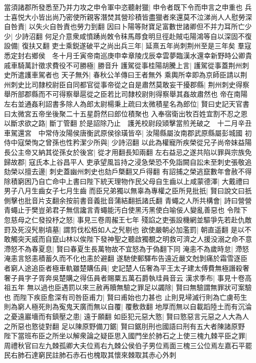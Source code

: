 當須諸郡所發悉至乃并力攻之申令軍中恣聽射獵|{
	申令者既下令而申言之申重也}
兵士喜悦大小皆出尚乃密使所親客潛焚其營珍積皆盡獵者來還莫不泣涕尚人人慰勞深自咎責|{
	以失火自咎責也勞力到翻}
因曰卜陽等財寶足富數世諸卿但不并力耳所亡少少|{
	少詩沼翻}
何足介意衆咸憤踴尚敇令秣馬蓐食明旦徑赴賊屯陽鴻等自以深固不復設備|{
	復扶又翻}
吏士乘鋭遂破平之尚出兵三年|{
	延熹五年尚刺荆州至是三年矣}
羣寇悉定封右鄉侯　冬十月壬寅帝南巡庚申幸章陵戊辰幸雲夢臨漢水還幸新野時公卿貴戚車騎萬計徵求費役不可勝極|{
	勝音升}
護駕從事桂陽胡騰上言|{
	護駕從事蓋荆州刺史所遣護車駕者也}
天子無外|{
	春秋公羊傳曰王者無外}
乘輿所幸即為京師臣請以荆州刺史比司隸校尉臣自同都官從事帝從之自是肅然莫敢妄干擾郡縣|{
	荆州刺史得察舉所部郡縣而不可得察舉扈從之臣若比司隸校尉則得察舉其姦故肅然也}
帝在南陽左右並通姦利詔書多除人為郎太尉楊秉上疏曰太微積星名為郎位|{
	賢曰史記天官書曰太微宮五帝坐後聚二十五星蔚然曰郎位積聚也}
入奉宿衛出牧百姓宜割不忍之恩以斷求欲之路|{
	斷丁管翻}
於是詔除乃止　護羌校尉段熲擊當煎羌破之　十二月辛丑車駕還宮　中常侍汝陽侯唐衡武原侯徐璜皆卒|{
	汝陽縣屬汝南郡武原縣屬彭城國}
初侍中寇榮恂之曾孫也性矜潔少所與|{
	少詩沼翻}
以此為權寵所疾榮從兄子尚帝妺益陽長公主帝又納其從孫女於後宮|{
	從才用翻長知兩翻}
左右益忌之遂共陷以罪與宗族免歸故郡|{
	寇氏本上谷昌平人}
吏承望風旨持之浸急榮恐不免詣闕自訟未至刺史張敬追劾榮以擅去邊|{
	刺史蓋幽州刺史也劾戶槩翻又戶得翻}
有詔捕之榮逃竄數年會赦不得除積窮困乃自亡命中上書曰陛下統天理物作民父母自生齒以上咸蒙德澤|{
	大戴禮曰男子八月生齒女子七月生齒}
而臣兄弟獨以無辜為專權之臣所見批扺|{
	賢曰說文曰扺側擊也批音片支翻余按前書音義批音蒲結翻扺諸氏翻}
青蠅之人所共構會|{
	詩曰營營青蠅止于樊豈弟君子無信讒言青蠅能汚白使黑汚黑使白喻佞人變亂善惡也}
令陛下忽慈母之仁發投杼之怒|{
	事見三卷周赧王七年}
殘諂之吏張設機網並驅爭先若赴仇敵罸及死沒髠剔墳墓|{
	謂剪伐松栢如人之髠剔也}
欲使嚴朝必加濫罰|{
	朝直遥翻}
是以不敢觸突天威而自竄山林以俟陛下發神聖之聽啟獨覩之明救可濟之人援没溺之命不意滯怒不為春夏息|{
	賢曰春夏生長萬物故不宜怒為于偽翻下同}
淹恚不為歲時怠|{
	滯怒淹恚言怒恚積蓄久而不化也恚於避翻}
遂馳使郵驛布告遠近嚴文尅剝痛於霜雪逐臣者窮人途追臣者極車軌雖楚購伍員|{
	史記楚人伍奢為平王太子建太傅費無極譖殺奢奢子員字子胥奔吳楚購之得伍員者賜粟五萬石爵執珪員音云}
漢求季布|{
	事見十卷高祖五年}
無以過也臣遇罰以來三赦再贖無驗之罪足以蠲除|{
	賢曰無驗謂無罪狀可案驗也}
而陛下疾臣愈深有司咎臣甫力|{
	賢曰甫始也力甚也}
止則見埽滅行則為亡虜苟生則為窮人極死則為寃鬼天廣而無以自覆|{
	覆敷救翻}
地厚而無以自載蹈陸土而有沉淪之憂遠巖墻而有鎮壓之患|{
	遠于願翻}
如臣犯元惡大憝|{
	賢曰憝惡言元惡之人大為人之所惡也憝徒對翻}
足以陳原野備刀鋸|{
	賢曰鋸刖刑也國語曰刑有五大者陳諸原野}
陛下當班布臣之所坐以解衆論之疑臣思入國門坐於肺石之上使三槐九棘平臣之罪|{
	周禮秋官曰左九棘孤卿大夫位焉右九棘公侯伯子男位焉面三槐三公位焉左嘉石平罷民右肺石達窮民註肺石赤石也槐取其懷來棘取其赤心外刺}
